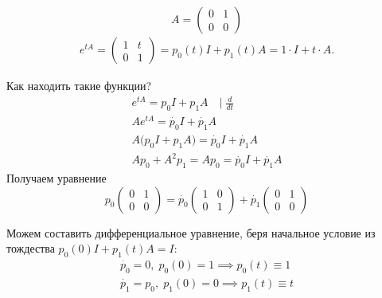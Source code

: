 \begin{exmp}
    \begin{equation*}
        A = \left( \begin{matrix}
            0 & 1 \\
            0 & 0
        \end{matrix} \right)
    \end{equation*}
    \begin{gather*}
        e^{tA} = \left( \begin{matrix}
            1 & t \\
            0 & 1
        \end{matrix} \right) = 
        p_0(t) I + p_1(t) A =
        1 \cdot I + t \cdot A.
    \end{gather*}

    Как находить такие функции?
    \begin{gather*}
        e^{tA} = p_0 I + p_1 A \quad \biggl| \; \frac{d}{dt}\\
        A e^{tA} = \dot{p_0} I + \dot{p_1}  A \\
        A \bigl(p_0 I + p_1 A \bigr) = \dot{p_0} I + \dot{p_1} A \\
        A p_0 + A^2 p_1 = A p_0 = \dot{p_0} I + \dot{p_1} A
    \end{gather*}
    Получаем уравнение
    \begin{equation*}
        p_0 \left( \begin{matrix}
            0 & 1 \\
            0 & 0
        \end{matrix} \right) = \dot{p_0} \left( \begin{matrix}
            1 & 0 \\
            0 & 1 
        \end{matrix} \right) + \dot{p_1} \left( \begin{matrix}
            0 & 1 \\
            0 & 0 
        \end{matrix} \right)
    \end{equation*}

    Можем составить дифференциальное уравнение, беря начальное условие из тождества $p_0(0) I + p_1(t) A = I$:
    \begin{gather*}
        \dot{p_0} = 0, \; p_0(0) = 1  \implies p_0(t) \equiv 1 \\
        \dot{p_1} = p_0, \; p_1(0) = 0 \implies p_1(t) \equiv t
    \end{gather*}
\end{exmp}

